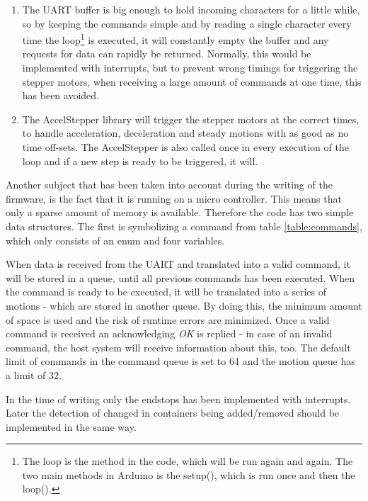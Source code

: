 \documentclass[10pt,a4paper]{article}
\begin{document}
		\begin{enumerate}
		\item The UART buffer is big enough to hold incoming characters for a little while, so by keeping the commands simple and by reading a single character every time the loop\footnote{The loop is the method in the code, which will be run again and again. The two main methods in Arduino is the setup(), which is run once and then the loop().} is executed, it will constantly empty the buffer and any requests for data can rapidly be returned. Normally, this would be implemented with interrupts, but to prevent wrong timings for triggering the stepper motors, when receiving a large amount of commands at one time, this has been avoided.
		\item The AccelStepper library\cite{accelStepperLibrary_webpage} will trigger the stepper motors at the correct times, to handle acceleration, deceleration and steady motions with as good as no time off-sets. The AccelStepper is also called once in every execution of the loop and if a new step is ready to be triggered, it will.
		\end{enumerate} 
		
		Another subject that has been taken into account during the writing of the firmware, is the fact that it is running on a micro controller. This means that only a sparse amount of memory is available. Therefore the code has two simple data structures. The first is symbolizing a command from table \ref{table:commands}, which only consists of an enum and four variables. 
		
		When data is received from the UART and translated into a valid command, it will be stored in a queue, until all previous commands has been executed. When the command is ready to be executed, it will be translated into a series of motions - which are stored in another queue. By doing this, the minimum amount of space is used and the risk of runtime errors are minimized. Once a valid command is received an acknowledging \textit{OK} is replied - in case of an invalid command, the host system will receive information about this, too. The default limit of commands in the command queue is set to 64 and the motion queue has a limit of 32.
		
		In the time of writing only the endstops has been implemented with interrupts. Later the detection of changed in containers being added/removed should be implemented in the same way.
		
		
	
	
\end{document}
